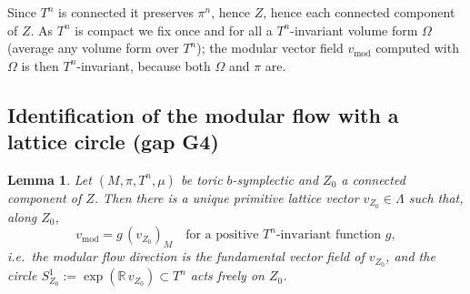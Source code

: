 \documentclass{amsart}
\newtheorem{lemma}{Lemma}
\theoremstyle{definition}
\begin{document}
Since $T^n$ is connected it preserves $\pi^n$, hence $Z$, hence each connected
component of $Z$. As $T^n$ is compact we fix once and for all a $T^n$-invariant
volume form $\Omega$ (average any volume form over $T^n$); the modular vector
field $v_{\mathrm{mod}}$ computed with $\Omega$ is then $T^n$-invariant, because
both $\Omega$ and $\pi$ are.

\subsection*{Identification of the modular flow with a lattice circle (gap G4)}

\begin{lemma}\label{lem:G4}
Let $(M,\pi,T^n,\mu)$ be toric $b$-symplectic and $Z_0$ a connected component of
$Z$. Then there is a unique primitive lattice vector $v_{Z_0}\in\Lambda$ such
that, along $Z_0$,
\[
v_{\mathrm{mod}}=g\,(v_{Z_0})_M\quad\text{for a positive }T^n\text{-invariant
function }g,
\]
i.e.\ the modular flow direction is the fundamental vector field of $v_{Z_0}$,
and the circle $S^1_{Z_0}:=\exp(\mathbb R\,v_{Z_0})\subset T^n$ acts freely on
$Z_0$.
\end{lemma}
\end{document}
